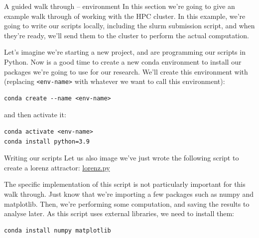 \documentclass[10pt]{beamer}
\begin{document}
\begin{frame}[label={sec:orga008763},fragile]{A guided walk through -- environment}
 In this section we're going to give an example walk through of working with the
HPC cluster. In this example, we're going to write our scripts locally,
including the slurm submission script, and when they're ready, we'll send them
to the cluster to perform the actual computation.

Let's imagine we're starting a new project, and are programming our scripts in
Python. Now is a good time to create a new conda environment to install our
packages we're going to use for our research. We'll create this environment with
(replacing \texttt{<env-name>} with whatever we want to call this environment):

\begin{verbatim}
conda create --name <env-name>
\end{verbatim}

and then activate it:

\begin{verbatim}
conda activate <env-name>
conda install python=3.9
\end{verbatim}
\end{frame}

\begin{frame}[label={sec:org552c84d},fragile]{Writing our scripts}
 Let us also image we've just wrote the following script to create a lorenz
attractor: \href{https://pageperso.lis-lab.fr/jay.morgan/resources/2021-programming-level-up/lectures/week-5/lorenz.py}{lorenz.py}

The specific implementation of this script is not particularly important for
this walk through. Just know that we're importing a few packages such as numpy
and matplotlib. Then, we're performing some computation, and saving the results
to analyse later. As this script uses external libraries, we need to install
them:

\begin{verbatim}
conda install numpy matplotlib
\end{verbatim}
\end{frame}
\end{document}
